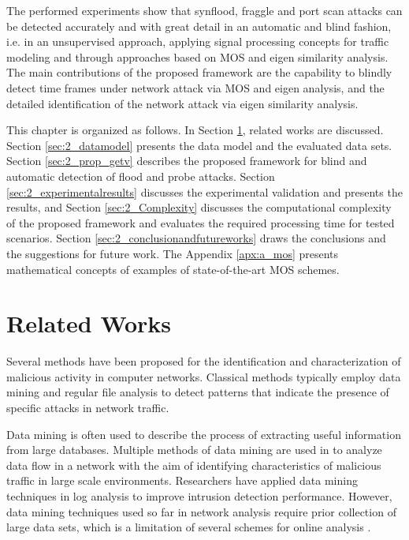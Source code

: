 The performed experiments show that synflood, fraggle and port scan attacks can be detected accurately and with great detail in an automatic and blind fashion, i.e. in an unsupervised approach, applying signal processing concepts for traffic modeling and through approaches based on MOS and eigen similarity analysis. The main contributions of the proposed framework are the capability to blindly detect time frames under network attack via MOS and eigen analysis, and the detailed identification of the network attack via eigen similarity analysis.

This chapter is organized as follows. In Section \ref{sec:2_relatedworks}, related works are discussed. Section \ref{sec:2_datamodel} presents the data model and the evaluated data sets. Section \ref{sec:2_prop_getv} describes the proposed framework for blind and automatic detection of flood and probe attacks. Section \ref{sec:2_experimentalresults} discusses the experimental validation and presents the results, and Section \ref{sec:2_Complexity} discusses the computational complexity of the proposed framework and evaluates the required processing time for tested scenarios. Section \ref{sec:2_conclusionandfutureworks} draws the conclusions and the suggestions for future work. The Appendix \ref{apx:a_mos} presents mathematical concepts of examples of state-of-the-art MOS schemes.


\section{Related Works}
\label{sec:2_relatedworks}

Several methods have been proposed for the identification and characterization of malicious activity in computer networks. Classical methods typically employ data mining \cite{he2008applying,ghourabi2010data,osanaiye2016distributed} and regular file analysis \cite{raynal2004honeypot} to detect patterns that indicate the presence of specific attacks in network traffic.

Data mining is often used to describe the process of extracting useful information from large databases. Multiple methods of data mining are used in \cite{he2008applying,osanaiye2016distributed} to analyze data flow in a network with the aim of identifying characteristics of malicious traffic in large scale environments. Researchers have applied data mining techniques in log analysis \cite{ghourabi2010data} to improve intrusion detection performance. However, data mining techniques used so far in network analysis require prior collection of large data sets, which is a limitation of several schemes for online analysis \cite{Huang2009}.

